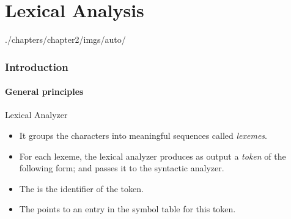 \part[author={\protect\insertauthor}]{Lexical Analysis}
\label{chap:lexical_analysis}

\begin{graphicspathcontext}{{./chapters/chapter2/imgs/auto/}}
\begin{bibunit}[apalike]
	
\tableofcontentslide

\section{Introduction}

\tableofcontentslide[sections={1-5},sectionstyle={show/shaded},subsectionstyle={show/show/hide},subsubsectionstyle={hide/hide/hide/hide}]

\subsection{General principles}
\begin{frame}{Lexical Analyzer}
	\begin{itemize}
	\item It groups the characters into meaningful sequences called \emph{lexemes}.
	\item For each lexeme, the lexical analyzer produces as output a \emph{token} of the following form; and passes it to the syntactic analyzer.
		\begin{center}
		\end{center}
	\item The  is the identifier of the token.
	\item The  points to an entry in the symbol table for this token.
	\end{itemize}
\end{frame}


\end{bibunit}
\end{graphicspathcontext}
